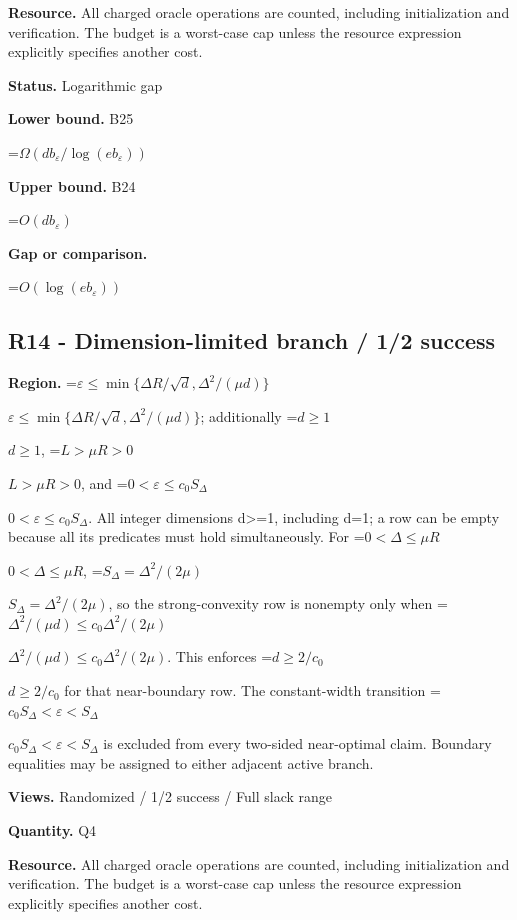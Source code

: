 \documentclass[10pt,a4paper]{article}
\newcommand{\AtlasMath}[1]{\par\begingroup\centering\setbox0=\hbox{$\displaystyle #1$}\ifdim\wd0>1.4\linewidth\typeout{ATLAS WIDE FORMULA: \the\wd0}\fi\ifdim\wd0>\linewidth\resizebox{\linewidth}{!}{\box0}\else\box0\fi\par\endgroup}
\newcommand{\AtlasInlineMath}[1]{\begingroup\setbox0=\hbox{$#1$}\ifdim\wd0>.4\linewidth\endgroup\AtlasMath{#1}\else\endgroup$#1$\fi}
\begin{document}
\textbf{Resource.} All charged oracle operations are counted, including initialization and verification. The budget is a worst-case cap unless the resource expression explicitly specifies another cost.



\textbf{Status.} Logarithmic gap



\textbf{Lower bound.} B25



\AtlasMath{\Omega(db_\varepsilon/\log(eb_\varepsilon))}


\textbf{Upper bound.} B24



\AtlasMath{O(db_\varepsilon)}


\textbf{Gap or comparison.}



\AtlasMath{O(\log(eb_\varepsilon))}


\subsection{R14 - Dimension-limited branch / 1/2 success}


\textbf{Region.} \AtlasInlineMath{\varepsilon\le\min\{\Delta R/\sqrt d,\Delta^2/(\mu d)\}}; additionally \AtlasInlineMath{d\ge1}, \AtlasInlineMath{L>\mu R>0}, and \AtlasInlineMath{0<\varepsilon\le c_0S_\Delta}. All integer dimensions d>=1, including d=1; a row can be empty because all its predicates must hold simultaneously. For \AtlasInlineMath{0<\Delta\le\mu R}, \AtlasInlineMath{S_\Delta=\Delta^2/(2\mu)}, so the strong-convexity row is nonempty only when \AtlasInlineMath{\Delta^2/(\mu d)\le c_0\Delta^2/(2\mu)}. This enforces \AtlasInlineMath{d\ge2/c_0} for that near-boundary row. The constant-width transition \AtlasInlineMath{c_0S_\Delta<\varepsilon<S_\Delta} is excluded from every two-sided near-optimal claim. Boundary equalities may be assigned to either adjacent active branch.



\textbf{Views.} Randomized / 1/2 success / Full slack range



\textbf{Quantity.} Q4



\textbf{Resource.} All charged oracle operations are counted, including initialization and verification. The budget is a worst-case cap unless the resource expression explicitly specifies another cost.
\end{document}
